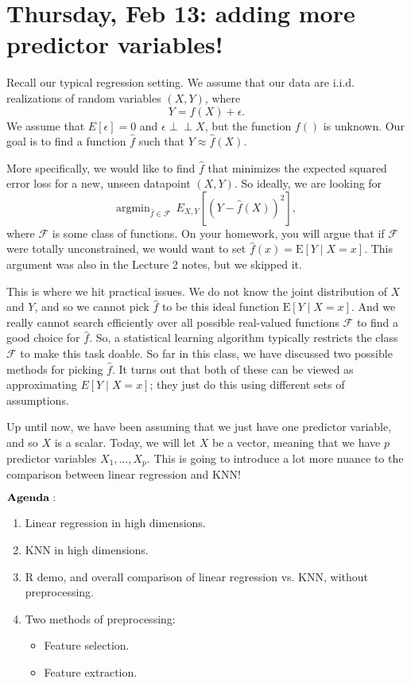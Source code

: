 \section{Thursday, Feb 13: adding more predictor variables!}

Recall our typical regression setting. We assume that our data are i.i.d. realizations of random variables $(X,Y)$, where
$$
Y = f(X) + \epsilon.
$$
We assume that $E[\epsilon]=0$ and $\epsilon \perp\!\!\!\perp X$, but the function $f()$ is unknown. Our goal is to find a function $\hat{f}$ such that $Y \approx \hat{f}(X)$. 

More specifically, we would like to find $\hat{f}$ that minimizes the expected squared error loss for a new, unseen datapoint $(X,Y)$. So ideally, we are looking for
\begin{equation}
\label{objective}
\mathrm{argmin}_{\hat{f} \in \mathcal{F}} \ \ E_{X,Y} \left[ \left(Y - \hat{f}(X)\right)^2 \right],
\end{equation}
where $\mathcal{F}$ is some class of functions. On your homework, you will argue that if $\mathcal{F}$ were totally unconstrained, we would want to set $\hat{f}(x) = \mathrm{E}[Y \mid X=x]$. This argument was also in the Lecture 2 notes, but we skipped it. 

This is where we hit practical issues. We do not know the joint distribution of $X$ and $Y$, and so we cannot pick $\hat{f}$ to be this ideal function $\mathrm{E}[Y \mid X=x]$. And we really cannot search efficiently over all possible real-valued functions $\mathcal{F}$ to find a good choice for $\hat{f}$. So, a statistical learning algorithm typically restricts the class $\mathcal{F}$ to make this task doable. So far in this class, we have discussed two possible methods for picking $\hat{f}$. It turns out that both of these can be viewed as approximating $E[Y \mid X=x]$; they just do this using different sets of assumptions. 

Up until now, we have been assuming that we just have one predictor variable, and so $X$ is a scalar. Today, we will let $X$ be a vector, meaning that we have $p$ predictor variables $X_1, \ldots, X_p$. This is going to introduce a lot more nuance to the comparison between linear regression and KNN!

$\bold{Agenda:}$
\begin{enumerate}
\item Linear regression in high dimensions.
\item KNN in high dimensions. 
\item R demo, and overall comparison of linear regression vs. KNN, without preprocessing.
\item Two methods of preprocessing:
\begin{itemize}
\item Feature selection.
\item Feature extraction. 	
\end{itemize}
\end{enumerate}

